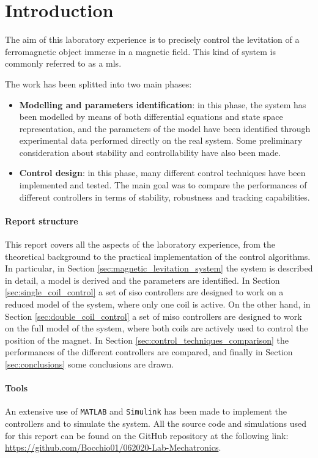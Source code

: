 \section{Introduction}
\label{sec:introduction}

The aim of this laboratory experience is to precisely control the levitation of a ferromagnetic object immerse in a magnetic field.
This kind of system is commonly referred to as a \acrfull{mls}.

The work has been splitted into two main phases:

\begin{itemize}
    \item \textbf{Modelling and parameters identification}: in this phase, the system has been modelled by means of both differential equations and state space representation, and the parameters of the model have been identified through experimental data performed directly on the real system. Some preliminary consideration about stability and controllability have also been made.
    \item \textbf{Control design}: in this phase, many different control techniques have been implemented and tested. The main goal was to compare the performances of different controllers in terms of stability, robustness and tracking capabilities.
\end{itemize}

\paragraph{Report structure}

This report covers all the aspects of the laboratory experience, from the theoretical background to the practical implementation of the control algorithms.
In particular, in Section \ref{sec:magnetic_levitation_system} the system is described in detail, a model is derived and the parameters are identified.
In Section \ref{sec:single_coil_control} a set of \acrshort{siso} controllers are designed to work on a reduced model of the system, where only one coil is active.
On the other hand, in Section \ref{sec:double_coil_control} a set of \acrshort{miso} controllers are designed to work on the full model of the system, where both coils are actively used to control the position of the magnet.
In Section \ref{sec:control_techniques_comparison} the performances of the different controllers are compared, and finally in Section \ref{sec:conclusions} some conclusions are drawn.

\paragraph{Tools}

An extensive use of \texttt{MATLAB} and \texttt{Simulink} has been made to implement the controllers and to simulate the system.
All the source code and simulations used for this report can be found on the GitHub repository at the following link: \url{https://github.com/Bocchio01/062020-Lab-Mechatronics}.